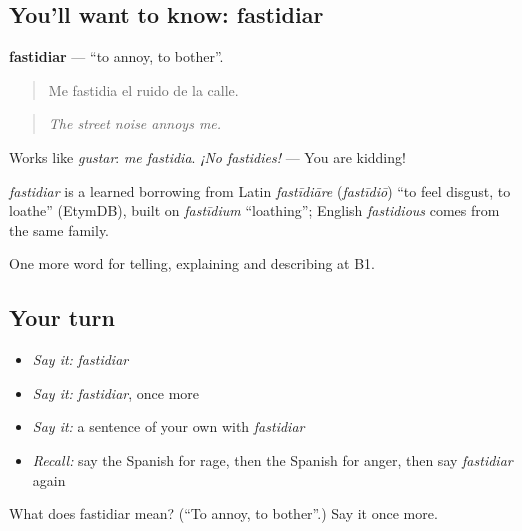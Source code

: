 \subsection*{You'll want to know: fastidiar}
\textbf{fastidiar} — \textquotedblleft{}to annoy, to bother\textquotedblright{}.

\begin{quote}
Me fastidia el ruido de la calle.
\end{quote}

\begin{quote}
\emph{The street noise annoys me.}
\end{quote}

Works like \emph{gustar}: \emph{me fastidia}. \emph{¡No fastidies!} — You are kidding!

\begin{cousinweb}
\emph{fastidiar} is a learned borrowing from Latin \emph{fastīdiāre} (\emph{fastīdiō}) \textquotedblleft{}to feel disgust, to loathe\textquotedblright{} (EtymDB), built on \emph{fastīdium} \textquotedblleft{}loathing\textquotedblright{}; English \emph{fastidious} comes from the same family.
\end{cousinweb}

\begin{grammarlens}[title={What you've built}]
One more word for telling, explaining and describing at B1.
\end{grammarlens}

\subsection*{Your turn}
\begin{itemize}
\raggedright
  \item \emph{Say it:} \emph{fastidiar}
  \item \emph{Say it:} \emph{fastidiar}, once more
  \item \emph{Say it:} a sentence of your own with \emph{fastidiar}
  \item \emph{Recall:} say the Spanish for rage, then the Spanish for anger, then say \emph{fastidiar} again
\end{itemize}

\begin{tcolorbox}[breakable,colback=teal!4,colframe=teal!35!black,title={Before you move on}]
What does fastidiar mean? (\textquotedblleft{}To annoy, to bother\textquotedblright{}.) Say it once more.
\end{tcolorbox}
